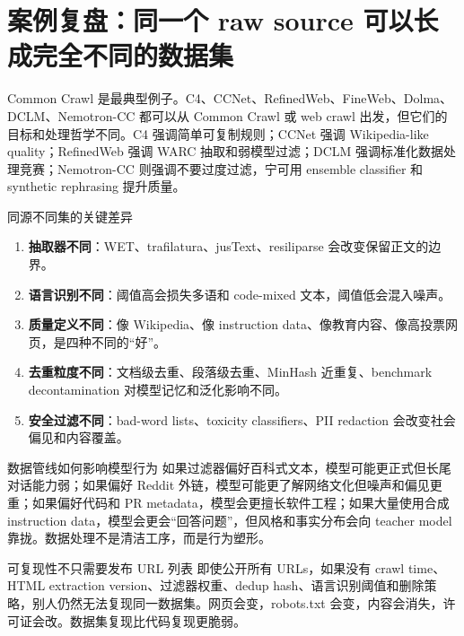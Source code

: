 \section{案例复盘：同一个 raw source 可以长成完全不同的数据集}

Common Crawl 是最典型例子。C4、CCNet、RefinedWeb、FineWeb、Dolma、DCLM、Nemotron-CC 都可以从 Common Crawl 或 web crawl 出发，但它们的目标和处理哲学不同。C4 强调简单可复制规则；CCNet 强调 Wikipedia-like quality；RefinedWeb 强调 WARC 抽取和弱模型过滤；DCLM 强调标准化数据处理竞赛；Nemotron-CC 则强调不要过度过滤，宁可用 ensemble classifier 和 synthetic rephrasing 提升质量。

\begin{importantbox}{同源不同集的关键差异}
\begin{enumerate}
    \item \textbf{抽取器不同}：WET、trafilatura、jusText、resiliparse 会改变保留正文的边界。
    \item \textbf{语言识别不同}：阈值高会损失多语和 code-mixed 文本，阈值低会混入噪声。
    \item \textbf{质量定义不同}：像 Wikipedia、像 instruction data、像教育内容、像高投票网页，是四种不同的“好”。
    \item \textbf{去重粒度不同}：文档级去重、段落级去重、MinHash 近重复、benchmark decontamination 对模型记忆和泛化影响不同。
    \item \textbf{安全过滤不同}：bad-word lists、toxicity classifiers、PII redaction 会改变社会偏见和内容覆盖。
\end{enumerate}
\end{importantbox}

\begin{knowledgebox}{数据管线如何影响模型行为}
如果过滤器偏好百科式文本，模型可能更正式但长尾对话能力弱；如果偏好 Reddit 外链，模型可能更了解网络文化但噪声和偏见更重；如果偏好代码和 PR metadata，模型会更擅长软件工程；如果大量使用合成 instruction data，模型会更会“回答问题”，但风格和事实分布会向 teacher model 靠拢。数据处理不是清洁工序，而是行为塑形。
\end{knowledgebox}

\begin{warningbox}{可复现性不只需要发布 URL 列表}
即使公开所有 URLs，如果没有 crawl time、HTML extraction version、过滤器权重、dedup hash、语言识别阈值和删除策略，别人仍然无法复现同一数据集。网页会变，robots.txt 会变，内容会消失，许可证会改。数据集复现比代码复现更脆弱。
\end{warningbox}

